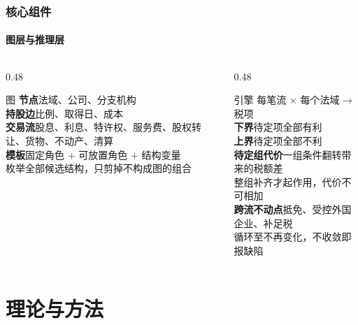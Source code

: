 \documentclass[english, sectionpage=false]{tumbeamer}
\newcommand{\subnote}[1]{{\footnotesize\color{TUMGrayDark} #1}}
\begin{document}
\begin{frame}
  \frametitle{核心组件}
  \framesubtitle{图层与推理层}
  \begin{columns}[T]
    \begin{column}{0.48\textwidth}
      \begin{TUMBox}{图}
        \textbf{节点}\quad 法域、公司、分支机构\\
        \textbf{持股边}\quad 比例、取得日、成本\\
        \textbf{交易流}\quad 股息、利息、特许权、服务费、股权转让、货物、不动产、清算\\[0.3em]
        \textbf{模板}\quad 固定角色 + 可放置角色 + 结构变量\\
        \subnote{枚举全部候选结构，只剪掉不构成图的组合}
      \end{TUMBox}
    \end{column}
    \begin{column}{0.48\textwidth}
      \begin{TUMBox}{引擎}
        每笔流 × 每个法域 → 税项\\
        \textbf{下界}\quad 待定项全部有利\\
        \textbf{上界}\quad 待定项全部不利\\[0.3em]
        \textbf{待定组代价}\quad 一组条件翻转带来的税额差\\
        \subnote{整组补齐才起作用，代价不可相加}\\[0.3em]
        \textbf{跨流不动点}\quad 抵免、受控外国企业、补足税\\
        \subnote{循环至不再变化，不收敛即报缺陷}
      \end{TUMBox}
    \end{column}
  \end{columns}
\end{frame}

\section{理论与方法}
\end{document}
